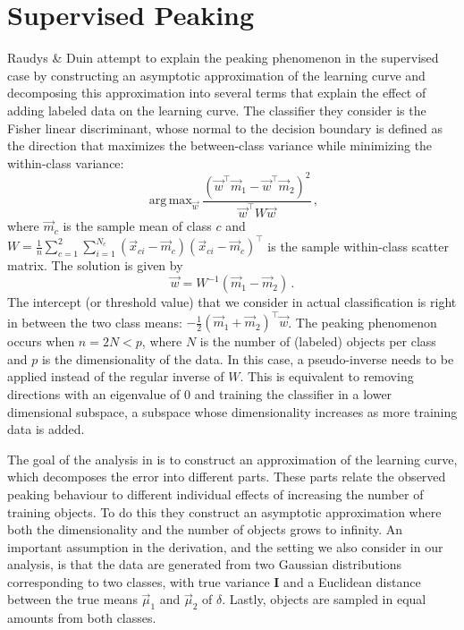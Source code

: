 \documentclass[runningheads,a4paper]{llncs}\usepackage[]{graphicx}\usepackage[]{color}
\DeclareMathOperator*{\argmax}{arg\,max}
\begin{document}
\section{Supervised Peaking} \label{section:supervisedpeaking}
Raudys \& Duin \cite{Raudys1998} attempt to explain the peaking phenomenon in the supervised case by constructing an asymptotic approximation of the learning curve and decomposing this approximation into several terms that explain the effect of adding labeled data on the learning curve. The classifier they consider is the Fisher linear discriminant, whose normal to the decision boundary is defined as the direction that maximizes the between-class variance while minimizing the within-class variance:
\begin{equation} \label{eq:fisherobjective}
\argmax_{\vec{w}} \frac{(\vec{w}^\top \vec{m}_1 - \vec{w}^\top \vec{m}_2)^2}{\vec{w}^\top W \vec{w}} \, ,
\end{equation}
where $\vec{m}_c$ is the sample mean of class $c$ and $W=\tfrac{1}{n} \sum_{c=1}^2 \sum_{i=1}^{N_c} (\vec{x}_{ci} - \vec{m}_c)(\vec{x}_{ci} - \vec{m}_c)^\top$ is the sample within-class scatter matrix. The solution is given by
\begin{equation} \label{eq:Wformulation}
\vec{w} = W^{-1} (\vec{m}_1-\vec{m}_2) \, .
\end{equation}
The intercept (or threshold value) that we consider in actual classification is right in between the two class means:
$-\frac{1}{2}(\vec{m}_1+\vec{m}_2)^\top \vec{w}$.  The peaking phenomenon occurs when $n=2N<p$, where $N$ is the number of (labeled) objects per class and $p$ is the dimensionality of the data. In this case, a pseudo-inverse needs to be applied instead of the regular inverse of $W$. This is equivalent to removing directions with an eigenvalue of $0$ and training the classifier in a lower dimensional subspace, a subspace whose dimensionality increases as more training data is added.

The goal of the analysis in \cite{Raudys1998} is to construct an approximation of the learning curve, which decomposes the error into different parts. These parts relate the observed peaking behaviour to different individual effects of increasing the number of training objects. To do this they construct an asymptotic approximation where both the dimensionality and the number of objects grows to infinity. An important assumption in the derivation, and the setting we also consider in our analysis, is that the data are generated from two Gaussian distributions corresponding to two classes, with true variance $\mathbf{I}$ and a Euclidean distance between the true means $\vec{\mu}_1$ and $\vec{\mu}_2$ of $\delta$. Lastly, objects are sampled in equal amounts from both classes.
\end{document}
